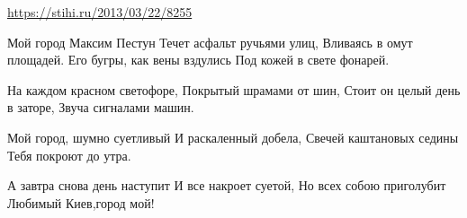  
 
 
 
 

\url{https://stihi.ru/2013/03/22/8255}

Мой город
Максим Пестун
Течет асфальт ручьями улиц,
Вливаясь в омут площадей.
Его бугры, как вены вздулись
Под кожей в свете фонарей.

На каждом красном светофоре,
Покрытый шрамами от шин,
Стоит он целый день в заторе,
Звуча сигналами машин.

Мой город, шумно суетливый
И раскаленный добела,
Свечей каштановых седины
Тебя покроют до утра.

А завтра снова день наступит
И все накроет суетой,
Но всех собою приголубит
Любимый Киев,город мой!
